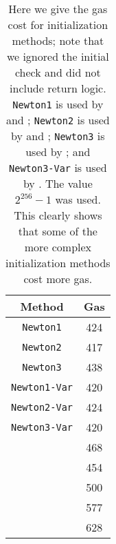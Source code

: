\begin{table}[p]
\centering
\begin{tabular}{|c|S[table-format=3.0]|}
\hline
Method & Gas \\
\hline
\texttt{Newton1}     & 424 \\
\texttt{Newton2}     & 417 \\
\texttt{Newton3}     & 438 \\
\texttt{Newton1-Var} & 420 \\
\texttt{Newton2-Var} & 424 \\
\texttt{Newton3-Var} & 420 \\
\BitLength{}         & 468 \\
\Linear{}            & 454 \\
\HyperFour{}         & 500 \\
\LookupFour{}        & 577 \\
\LookupEight{}       & 628 \\
\hline
\end{tabular}
\caption[Initialization Gas Costs]{Here we give
    the gas cost for initialization methods;
    note that we ignored the initial check and did not include
    return logic.
    \texttt{Newton1} is used by \UnrolledOne{} and \WhileOne{};
    \texttt{Newton2} is used by \UnrolledTwo{} and \WhileTwo{};
    \texttt{Newton3} is used by \WhileThree{};
    and \texttt{Newton3-Var} is used by \UnrolledThree{}.
    The value $2^{256}-1$ was used.
    This clearly shows that some of the more complex initialization methods
    cost more gas.
    }
\label{table:initialzation_gas_costs}
\end{table}
